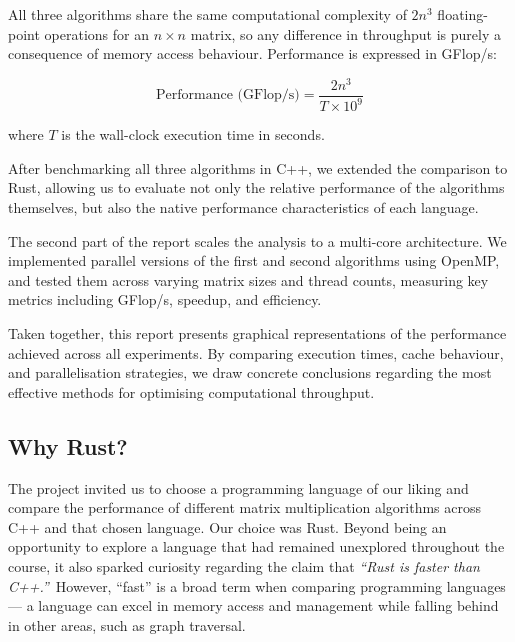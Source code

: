 \documentclass[12pt,a4paper]{article}
\begin{document}
All three algorithms share the same computational complexity of $2n^3$
floating-point operations for an $n \times n$ matrix, so any difference in
throughput is purely a consequence of memory access behaviour. Performance is
expressed in GFlop/s:

\begin{equation}
  \text{Performance (GFlop/s)} = \frac{2n^3}{T \times 10^9}
  \label{eq:gflops}
\end{equation}

\noindent where $T$ is the wall-clock execution time in seconds.

After benchmarking all three algorithms in C++, we extended the comparison to
Rust, allowing us to evaluate not only the relative performance of the
algorithms themselves, but also the native performance characteristics of each
language.

The second part of the report scales the analysis to a multi-core
architecture. We implemented parallel versions of the first and second
algorithms using OpenMP, and tested them across varying matrix sizes and thread
counts, measuring key metrics including GFlop/s, speedup, and efficiency.

Taken together, this report presents graphical representations of the
performance achieved across all experiments. By comparing execution times,
cache behaviour, and parallelisation strategies, we draw concrete conclusions
regarding the most effective methods for optimising computational throughput.

\subsection{Why Rust?}
\label{sec:why-rust}

The project invited us to choose a programming language of our liking and
compare the performance of different matrix multiplication algorithms across
C++ and that chosen language. Our choice was Rust. Beyond being an opportunity
to explore a language that had remained unexplored throughout the course, it
also sparked curiosity regarding the claim that \textit{``Rust is faster than
C++.''}\ However, ``fast'' is a broad term when comparing programming
languages --- a language can excel in memory access and management while
falling behind in other areas, such as graph traversal.
\end{document}
